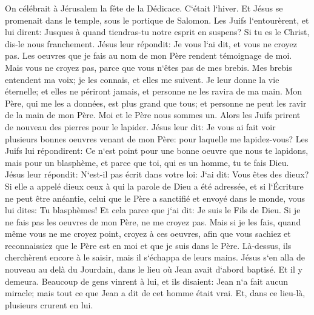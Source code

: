 \verse On célébrait à Jérusalem la fête de la Dédicace. C`était l`hiver. 
\verse Et Jésus se promenait dans le temple, sous le portique de Salomon. 
\verse Les Juifs l`entourèrent, et lui dirent: Jusques à quand tiendras-tu notre esprit en suspens? Si tu es le Christ, dis-le nous franchement. 
\verse Jésus leur répondit: Je vous l`ai dit, et vous ne croyez pas. Les oeuvres que je fais au nom de mon Père rendent témoignage de moi. 
\verse Mais vous ne croyez pas, parce que vous n`êtes pas de mes brebis. 
\verse Mes brebis entendent ma voix; je les connais, et elles me suivent. 
\verse Je leur donne la vie éternelle; et elles ne périront jamais, et personne ne les ravira de ma main. 
\verse Mon Père, qui me les a données, est plus grand que tous; et personne ne peut les ravir de la main de mon Père. 
\verse Moi et le Père nous sommes un. 
\verse Alors les Juifs prirent de nouveau des pierres pour le lapider. 
\verse Jésus leur dit: Je vous ai fait voir plusieurs bonnes oeuvres venant de mon Père: pour laquelle me lapidez-vous? 
\verse Les Juifs lui répondirent: Ce n`est point pour une bonne oeuvre que nous te lapidons, mais pour un blasphème, et parce que toi, qui es un homme, tu te fais Dieu. 
\verse Jésus leur répondit: N`est-il pas écrit dans votre loi: J`ai dit: Vous êtes des dieux? 
\verse Si elle a appelé dieux ceux à qui la parole de Dieu a été adressée, et si l`Écriture ne peut être anéantie, 
\verse celui que le Père a sanctifié et envoyé dans le monde, vous lui dites: Tu blasphèmes! Et cela parce que j`ai dit: Je suis le Fils de Dieu. 
\verse Si je ne fais pas les oeuvres de mon Père, ne me croyez pas. 
\verse Mais si je les fais, quand même vous ne me croyez point, croyez à ces oeuvres, afin que vous sachiez et reconnaissiez que le Père est en moi et que je suis dans le Père. 
\verse Là-dessus, ils cherchèrent encore à le saisir, mais il s`échappa de leurs mains. 
\verse Jésus s`en alla de nouveau au delà du Jourdain, dans le lieu où Jean avait d`abord baptisé. Et il y demeura. 
\verse Beaucoup de gens vinrent à lui, et ils disaient: Jean n`a fait aucun miracle; mais tout ce que Jean a dit de cet homme était vrai. 
\verse Et, dans ce lieu-là, plusieurs crurent en lui. 

